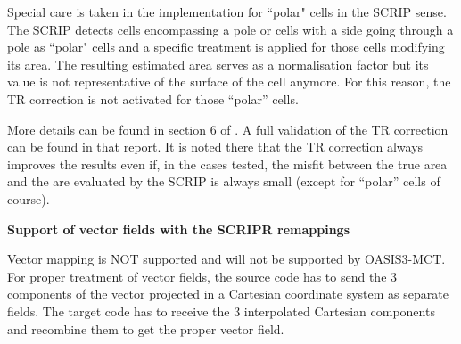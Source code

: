 \begin{itemize}
Special care is taken in the implementation for ``polar" cells in the
SCRIP sense. The SCRIP detects cells encompassing a pole or cells with
a side going through a pole as ``polar" cells and a specific treatment
is applied for those cells modifying its area. The resulting estimated
area serves as a normalisation factor but its value is not
representative of the surface of the cell anymore. For this reason,
the TR correction is not activated for those ``polar'' cells.

More details can be found in section 6 of \cite{valcke19}. A full validation of the TR correction can be found in that report. It is noted there that the TR correction always improves the results even if, in the cases tested, the misfit between the true area and the are evaluated by the SCRIP is always small (except for ``polar'' cells of course).  







  {\bf Support of vector fields with the SCRIPR remappings}

  Vector mapping is NOT supported and will not be supported by
  OASIS3-MCT. For proper treatment of vector fields, the source 
  code has to send the 3 components of the vector projected in a
  Cartesian coordinate system as separate fields. The target 
  code has to receive the 3 interpolated Cartesian components and
  recombine them to get the proper vector field.


\end{itemize}
